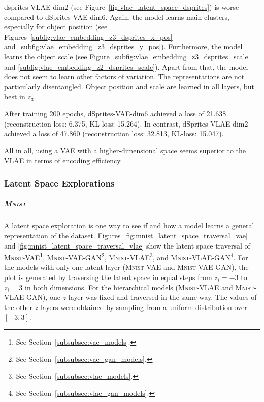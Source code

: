 dsprites-\ac{VLAE}-dim2 (see Figure~\ref{fig:vlae_latent_space_dsprites}) is worse compared to dSprites-\ac{VAE}-dim6.
Again, the model learns main clusters, especially for object position (see Figures~\ref{subfig:vlae_embedding_z3_dsprites_x_pos} and~\ref{subfig:vlae_embedding_z3_dsprites_y_pos}).
Furthermore, the model learns the object scale (see Figure~\ref{subfig:vlae_embedding_z3_dsprites_scale} and \ref{subfig:vlae_embedding_z2_dsprites_scale}).
Apart from that, the model does not seem to learn other factors of variation.
The representations are not particularly disentangled.
Object position and scale are learned in all layers, but best in $z_3$.

After training 200 epochs, dSprites-\ac{VAE}-dim6 achieved a loss of 21.638 (reconstruction loss: 6.375, \ac{KL}-loss: 15.264).
In contrast, dSprites-\ac{VLAE}-dim2 achieved a loss of 47.860 (reconstruction loss: 32.813, \ac{KL}-loss: 15.047).

All in all, using a \ac{VAE} with a higher-dimensional space seems superior to the \ac{VLAE} in terms of encoding efficiency.

\subsubsection{Latent Space Explorations}\label{subsubsec:latent_space_traversals}

\subparagraph{\textsc{Mnist}}

A latent space exploration is one way to see if and how a model learns a general representation of the dataset.
Figures~\ref{fig:mnist_latent_space_traversal_vae} and \ref{fig:mnist_latent_space_traversal_vlae} show the latent space traversal of \textsc{Mnist}-\ac{VAE}\footnote{See Section~\ref{subsubsec:vae_models}.}, \textsc{Mnist}-\ac{VAE}-\ac{GAN}\footnote{See Section~\ref{subsubsec:vae_gan_models}.}, \textsc{Mnist}-\ac{VLAE}\footnote{See Section~\ref{subsubsec:vlae_models}.}, and \textsc{Mnist}-\ac{VLAE}-\ac{GAN}\footnote{See Section~\ref{subsubsec:vlae_gan_models}.}.
For the models with only one latent layer (\textsc{Mnist}-\ac{VAE} and \textsc{Mnist}-\ac{VAE}-\ac{GAN}), the plot is generated by traversing the latent space in equal steps from $z_i = -3$ to $z_i = 3$ in both dimensions.
For the hierarchical models (\textsc{Mnist}-\ac{VLAE} and \textsc{Mnist}-\ac{VLAE}-\ac{GAN}), one $z$-layer was fixed and traversed in the same way.
The values of the other $z$-layers were obtained by sampling from a uniform distribution over $[-3; 3]$.


